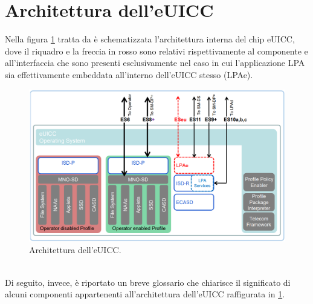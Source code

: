 \documentclass[10pt, oneside]{book}
\begin{document}
\section{Architettura dell'eUICC}
Nella figura \ref{fig:eUICC-arch} tratta da \cite{GSMA-docs-new} è schematizzata l'architettura interna del chip eUICC, dove il riquadro e la freccia in rosso sono relativi rispettivamente al componente e all'interfaccia che sono presenti esclusivamente nel caso in cui l'applicazione LPA sia effettivamente embeddata all'interno dell'eUICC stesso (LPAe).
\begin{figure}
\includegraphics[width=\linewidth]{eUICC-arch.png}
\caption{Architettura dell'eUICC.}
\label{fig:eUICC-arch}
\end{figure}
\\Di seguito, invece, è riportato un breve glossario che chiarisce il significato di alcuni componenti appartenenti all'architettura dell'eUICC raffigurata in \ref{fig:eUICC-arch}.
\end{document}

